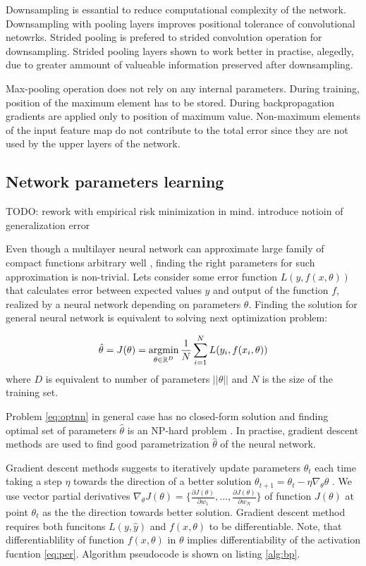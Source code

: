 Downsampling is essantial to reduce computational complexity of the network.
Downsampling with pooling layers improves positional tolerance of convolutional netowrks.
Strided pooling is prefered to strided convolution operation for downsampling. Strided pooling layers shown to work better in practise, alegedly, due to greater ammount of valueable information preserved after downsampling.

Max-pooling operation does not rely on any internal parameters. During training, position of the maximum element has to be stored. During backpropagation gradients are applied only to position of maximum value. Non-maximum elements of the input feature map do not contribute to the total error since they are not used by the upper layers of the network.

\subsection{Network parameters learning}
\label{ch:opt}

TODO: rework with empirical risk minimization in mind. introduce notioin of generalization error

Even though a multilayer neural network can approximate large family of compact functions arbitrary well \cite{Debao1993}, finding the right parameters for such approximation is non-trivial.
Lets consider some error function $L(y, f(x, \theta))$ that calculates error between expected values $y$ and output of the function $f$, realized by a neural network depending on parameters $\theta$. Finding the solution for general neural network is equivalent to solving next optimization problem:

\begin{equation}\label{eq:optnn}
  \hat{\theta} = J(\theta) = \operatorname*{argmin}_{\theta \in \Bbb{R}^D} \frac{1}{N} \sum_{i=1}^{N} L(y_i, f(x_i, \theta))
\end{equation}
where $D$ is equivalent to number of parameters $||\theta||$ and $N$ is the size of the training set.

Problem \ref{eq:optnn} in general case has no closed-form solution and finding optimal set of parameters $\hat{\theta}$ is an NP-hard problem \cite{Anandkumar16}.
In practise, gradient descent methods are used to find good parametrization $\hat{\theta}$ of the neural network.

Gradient descent methods suggests to iteratively update parameters $\theta_t$ each time taking a step $\eta$ towards the direction of a better solution $\theta_{t+1}=\theta_t - \eta \nabla_\theta \theta$ \cite{Cauchy1847}.
We use vector partial derivatives $\nabla_\theta J(\theta)=\{ \frac{\partial J(\theta)}{\partial w_1}, \ldots, \frac{\partial J(\theta)}{\partial w_N} \}$ of function $J(\theta)$ at point $\theta_t$ as the the direction towards better solution. Gradient descent method requires both funcitons $L(y, \hat{y})$ and $f(x, \theta)$ to be differentiable. Note, that differentiablility of function $f(x, \theta)$ in $\theta$ implies differentiability of the activation fucntion \ref{eq:per}. Algorithm pseudocode is shown on listing \ref{alg:bp}.

